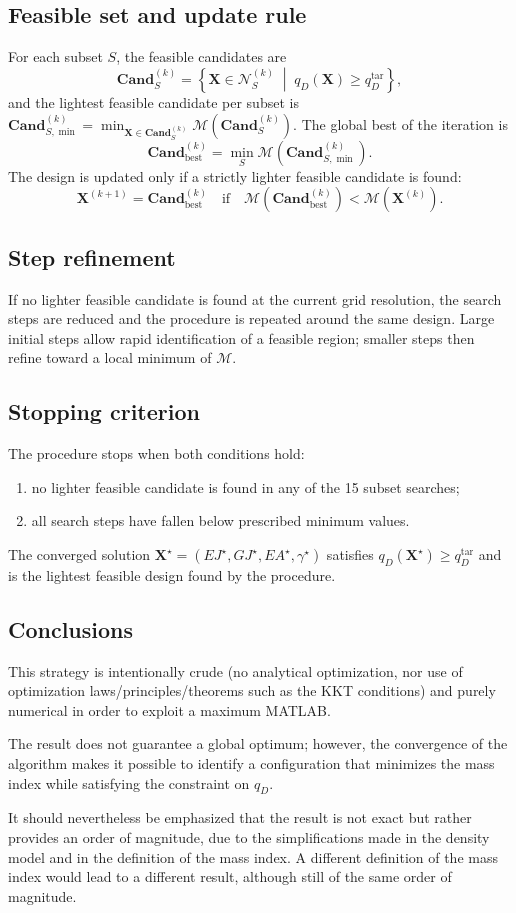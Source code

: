\subsection*{Feasible set and update rule} For each subset $S$, the feasible candidates are
\[
\mathbf{Cand}^{(k)}_S  = \left\{\mathbf{X}\in\mathcal{N}^{(k)}_S \;\middle|\; q_D(\mathbf{X})\ge q_D^{\mathrm{tar}}\right\},
\]
and the lightest feasible candidate per subset is $\mathbf{Cand}^{(k)}_{S,\min} = \min_{\mathbf{X}\in\mathbf{Cand}^{(k)}_S}\mathcal{M}\!\left(\mathbf{Cand}^{(k)}_S\right)$. The global best of the iteration is
\[
\mathbf{Cand}^{(k)}_{\mathrm{best}}=\min_{S}\mathcal{M}\!\left(\mathbf{Cand}^{(k)}_{S, \min}\right).
\]
The design is updated only if a strictly lighter feasible candidate is found:
\[
\mathbf{X}^{(k+1)}=\mathbf{Cand}^{(k)}_{\mathrm{best}}
\quad\text{if}\quad
\mathcal{M}\!\left(\mathbf{Cand}^{(k)}_{\mathrm{best}}\right)<\mathcal{M}\!\left(\mathbf{X}^{(k)}\right).
\]

\subsection*{Step refinement} If no lighter feasible candidate is found at the current grid resolution, the search steps are reduced and the procedure is repeated around the same design. Large initial steps allow rapid identification of a feasible region; smaller steps then refine toward a local minimum of $\mathcal{M}$.

\subsection*{Stopping criterion} The procedure stops when both conditions hold:
\begin{enumerate}\itemsep=0pt
    \item no lighter feasible candidate is found in any of the 15 subset searches;
    \item all search steps have fallen below prescribed minimum values.
\end{enumerate}
The converged solution $\mathbf{X}^\star=(EJ^\star,GJ^\star,EA^\star,\gamma^\star)$ satisfies $q_D(\mathbf{X}^\star)\ge q_D^{\mathrm{tar}}$ and is the lightest feasible design found by the procedure.

\subsection*{Conclusions} This strategy is intentionally crude (no analytical optimization, nor use of optimization laws/principles/theorems such as the KKT conditions) and purely numerical in order to exploit a maximum MATLAB.

The result does not guarantee a global optimum; however, the convergence of the algorithm makes it possible to identify a configuration that minimizes the mass index while satisfying the constraint on $q_D$.

It should nevertheless be emphasized that the result is not exact but rather provides an order of magnitude, due to the simplifications made in the density model and in the definition of the mass index. A different definition of the mass index would lead to a different result, although still of the same order of magnitude.
